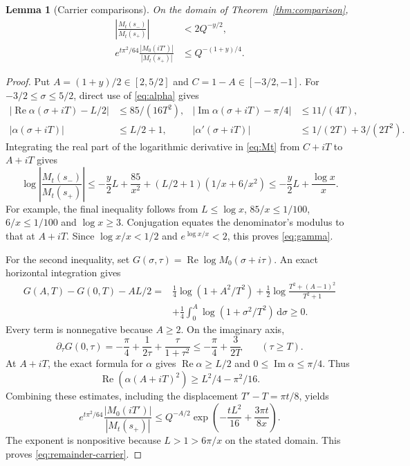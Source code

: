 \documentclass[11pt]{article}
\newtheorem{lemma}[theorem]{Lemma}
\theoremstyle{remark}
\newcommand{\dd}{\,\mathrm d}
\newcommand{\abs}[1]{\left\lvert#1\right\rvert}
\numberwithin{equation}{section}
\begin{document}
\begin{lemma}[Carrier comparisons]\label{lem:carriers}
On the domain of Theorem~\ref{thm:comparison},
\begin{align}
 \abs{\frac{M_t(s_-)}{M_t(s_+)}}&<2Q^{-y/2},\label{eq:gamma}\\
 e^{t\pi^2/64}\frac{|M_0(iT')|}{|M_t(s_+)|}
   &\le Q^{-(1+y)/4}.\label{eq:remainder-carrier}
\end{align}
\end{lemma}
\begin{proof}
Put $A=(1+y)/2\in[2,5/2]$ and $C=1-A\in[-3/2,-1]$.
For $-3/2\le\sigma\le5/2$, direct use of \eqref{eq:alpha} gives
\begin{align*}
 \abs{\operatorname{Re}\alpha(\sigma+iT)-L/2}&\le85/(16T^2),&
 \abs{\operatorname{Im}\alpha(\sigma+iT)-\pi/4}&\le11/(4T),\\
 |\alpha(\sigma+iT)|&\le L/2+1,&
 |\alpha'(\sigma+iT)|&\le1/(2T)+3/(2T^2).
\end{align*}
Integrating the real part of the logarithmic derivative in
\eqref{eq:Mt} from $C+iT$ to $A+iT$ gives
\[
 \log\abs{\frac{M_t(s_-)}{M_t(s_+)}}
 \le-\frac y2L+\frac{85}{x^2}
                 +(L/2+1)(1/x+6/x^2)
 \le-\frac y2L+\frac{\log x}{x}.
\]
For example, the final inequality follows from $L\le\log x$,
$85/x\le1/100$, $6/x\le1/100$ and $\log x\ge3$.
Conjugation equates the denominator's modulus to that at $A+iT$.
Since $\log x/x<1/2$ and $e^{\log x/x}<2$, this proves
\eqref{eq:gamma}.

For the second inequality, set
$G(\sigma,\tau)=\operatorname{Re}\log M_0(\sigma+i\tau)$.
An exact horizontal integration gives
\begin{align*}
 G(A,T)-G(0,T)-AL/2
   ={}&\tfrac14\log(1+A^2/T^2)
       +\tfrac12\log\frac{T^2+(A-1)^2}{T^2+1}\\
      &+\tfrac14\int_0^A\log(1+\sigma^2/T^2)\dd\sigma\ge0.
\end{align*}
Every term is nonnegative because $A\ge2$. On the imaginary axis,
\[
 \partial_\tau G(0,\tau)
 =-\frac\pi4+\frac1{2\tau}+\frac{\tau}{1+\tau^2}
 \le-\frac\pi4+\frac3{2T}\qquad(\tau\ge T).
\]
At $A+iT$, the exact formula for $\alpha$ gives
$\operatorname{Re}\alpha\ge L/2$ and
$0\le\operatorname{Im}\alpha\le\pi/4$. Thus
\[
 \operatorname{Re}(\alpha(A+iT)^2)\ge L^2/4-\pi^2/16.
\]
Combining these estimates, including the displacement
$T'-T=\pi t/8$, yields
\begin{equation}\label{eq:carrier-cancellation}
 e^{t\pi^2/64}\frac{|M_0(iT')|}{|M_t(s_+)|}
 \le Q^{-A/2}\exp\left(-\frac{tL^2}{16}+\frac{3\pi t}{8x}\right).
\end{equation}
The exponent is nonpositive because $L>1>6\pi/x$ on the stated
domain. This proves \eqref{eq:remainder-carrier}.
\end{proof}
\end{document}
